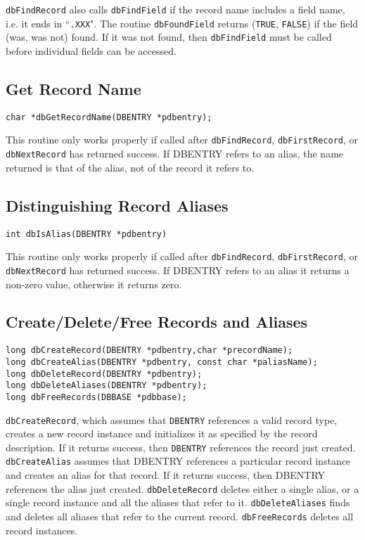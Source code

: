 \verb|dbFindRecord| also calls \verb|dbFindField| if the record name includes a field name, i.e. it ends in ``\verb|.XXX|". The routine 
\verb|dbFoundField| returns (\verb|TRUE|, \verb|FALSE|) if the field (was, was not) found. If it was not found, then \verb|dbFindField| must 
be called before individual fields can be accessed.

\subsection{Get Record Name}

\begin{verbatim}
char *dbGetRecordName(DBENTRY *pdbentry);
\end{verbatim}

This routine only works properly if called after \verb|dbFindRecord|, \verb|dbFirstRecord|, or \verb|dbNextRecord| has returned 
success. If DBENTRY refers to an alias, the name returned is that of the alias, not of the record it refers to.

\subsection{Distinguishing Record Aliases}

\begin{verbatim}
int dbIsAlias(DBENTRY *pdbentry)
\end{verbatim}

This routine only works properly if called after \verb|dbFindRecord|, \verb|dbFirstRecord|, or \verb|dbNextRecord| has returned 
success. If DBENTRY refers to an alias it returns a non-zero value, otherwise it returns zero.

\subsection{Create/Delete/Free Records and Aliases}

\begin{verbatim}
long dbCreateRecord(DBENTRY *pdbentry,char *precordName);
long dbCreateAlias(DBENTRY *pdbentry, const char *paliasName);
long dbDeleteRecord(DBENTRY *pdbentry);
long dbDeleteAliases(DBENTRY *pdbentry);
long dbFreeRecords(DBBASE *pdbbase);
\end{verbatim}

\verb|dbCreateRecord|, which assumes that \verb|DBENTRY| references a valid record type, creates a new record instance and 
initializes it as specified by the record description. If it returns success, then \verb|DBENTRY| references the record just created. 
\verb|dbCreateAlias| assumes that DBENTRY references a particular record instance and creates an alias for that record. If 
it returns success, then DBENTRY references the alias just created. \verb|dbDeleteRecord| deletes either a single alias, or a 
single record instance and all the aliases that refer to it. \verb|dbDeleteAliases| finds and deletes all aliases that refer to the 
current record. \verb|dbFreeRecords| deletes all record instances.


